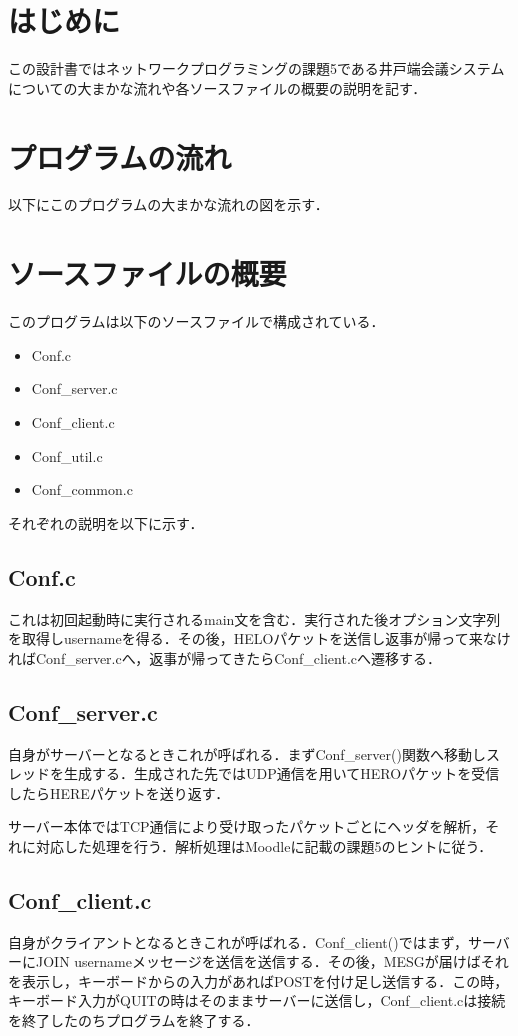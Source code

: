 \documentclass[11pt]{jsarticle}
\begin{document}
    \section{はじめに}
        この設計書ではネットワークプログラミングの課題5である井戸端会議システムについての大まかな流れや各ソースファイルの概要の説明を記す．
    \section{プログラムの流れ}
        以下にこのプログラムの大まかな流れの図を示す．
\newpage
    \section{ソースファイルの概要}
        このプログラムは以下のソースファイルで構成されている．
        \begin{itemize}
            \item Conf.c
            \item Conf\_server.c
            \item Conf\_client.c
            \item Conf\_util.c
            \item Conf\_common.c
        \end{itemize}
        それぞれの説明を以下に示す．
    \subsection{Conf.c}
        これは初回起動時に実行されるmain文を含む．実行された後オプション文字列を取得しusernameを得る．その後，HELOパケットを送信し返事が帰って来なければConf\_server.cへ，返事が帰ってきたらConf\_client.cへ遷移する．
    \subsection{Conf\_server.c}
        自身がサーバーとなるときこれが呼ばれる．まずConf\_server()関数へ移動しスレッドを生成する．生成された先ではUDP通信を用いてHEROパケットを受信したらHEREパケットを送り返す．
        
        サーバー本体ではTCP通信により受け取ったパケットごとにヘッダを解析，それに対応した処理を行う．解析処理はMoodleに記載の課題5のヒントに従う．
        
    \subsection{Conf\_client.c}
        自身がクライアントとなるときこれが呼ばれる．Conf\_client()ではまず，サーバーにJOIN usernameメッセージを送信を送信する．その後，MESGが届けばそれを表示し，キーボードからの入力があればPOSTを付け足し送信する．この時，キーボード入力がQUITの時はそのままサーバーに送信し，Conf\_client.cは接続を終了したのちプログラムを終了する．
    
\end{document}
